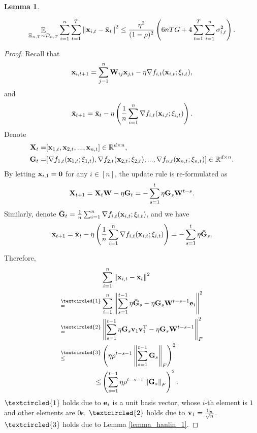 \documentclass{article}
\newtheorem{Lemma}{\bf{Lemma}}
\begin{document}
\begin{Lemma}
\label{lemma_x_variance_norm_square}

\begin{align}
\nonumber
\mathop{\mathbb{E}}_{ \Xi_{n,T} \sim \mathcal{D}_{n,T} } \sum_{i=1}^n\sum_{t=1}^T \left\lVert{\bf x}_{i,t} - \bar{{\bf x}}_t\right\rVert^2 \le \frac{\eta^2}{(1-\rho)^2}   \left(  6nTG + 4\sum_{t=1}^T\sum_{i=1}^n \sigma_{i,t}^2  \right).
\end{align}

\end{Lemma}
\begin{proof}


Recall that 
\begin{align}
\nonumber
{\bf x}_{i,t+1} = \sum_{j=1}^n {\bf W}_{ij}{\bf x}_{j,t} - \eta \nabla f_{i,t}({\bf x}_{i,t};\xi_{i,t}),
\end{align} and 
\begin{align}
\nonumber
\bar{{\bf x}}_{t+1} = \bar{{\bf x}}_t - \eta \left( \frac{1}{n}\sum_{i=1}^n \nabla f_{i,t}({\bf x}_{i,t};\xi_{i,t}) \right).
\end{align} Denote 
\begin{align}
\nonumber
{\bf X}_t = &  [{\bf x}_{1,t}, {\bf x}_{2,t}, ..., {\bf x}_{n,t}] \in \mathbb{R}^{d\times n}, \\ \nonumber
{\bf G}_t = & [\nabla f_{1,t}({\bf x}_{1,t};\xi_{1,t}), \nabla f_{2,t}({\bf x}_{2,t};\xi_{2,t}), ..., \nabla f_{n,t}({\bf x}_{n,t};\xi_{n,t})] \in \mathbb{R}^{d\times n}.
\end{align} By letting ${\bf x}_{i,1} = {\bf 0}$ for any $i\in[n]$, the update rule is re-formulated as 
\begin{align}
\nonumber
{\bf X}_{t+1} = {\bf X}_t {\bf W} - \eta {\bf G}_t = - \sum_{s=1}^t \eta {\bf G}_s {\bf W}^{t-s}. 
\end{align} Similarly, denote $\bar{{\bf G}}_t = \frac{1}{n}\sum_{i=1}^n \nabla f_{i,t}({\bf x}_{i,t};\xi_{i,t})$, and we have
\begin{align}
\bar{{\bf x}}_{t+1} = \bar{{\bf x}}_t - \eta \left( \frac{1}{n}\sum_{i=1}^n \nabla f_{i,t}({\bf x}_{i,t};\xi_{i,t}) \right) = - \sum_{s=1}^t \eta \bar{{\bf G}}_s. 
\end{align}


Therefore, 
\begin{align}
\nonumber
& \sum_{i=1}^n \lrnorm{\x_{i,t} - \bar{\x}_t}^2 \\ \nonumber
\refabovecir{=}{\textcircled{1}} & \sum_{i=1}^n \lrnorm{ \sum_{s=1}^{t-1} \eta \bar{\G}_s - \eta \G_s \W^{t-s-1}\e_i }^2   \\ \nonumber
\refabovecir{=}{\textcircled{2}} & \lrnorm{ \sum_{s=1}^{t-1} \eta \G_s\v_1 \v_1\Tr - \eta \G_s \W^{t-s-1} }^2_F   \\ \nonumber
\refabovecir{\le}{\textcircled{3}} & \lrincir{ \eta \rho^{t-s-1} \lrnorm{\sum_{s=1}^{t-1}\G_s}_F}^2 \\ \nonumber
\le & \lrincir{ \sum_{s=1}^{t-1} \eta \rho^{t-s-1} \lrnorm{\G_s}_F}^2.
\end{align} $\textcircled{1}$ holds due to ${\bf e}_i$ is a unit basis vector, whose $i$-th element is $1$ and other elements are $0$s. $\textcircled{2}$ holds due to ${\bf v}_1 = \frac{{\bf 1}_n}{\sqrt{n}}$. $\textcircled{3}$ holds due to Lemma \ref{lemma_hanlin_1}. 



\end{proof}
\end{document}
